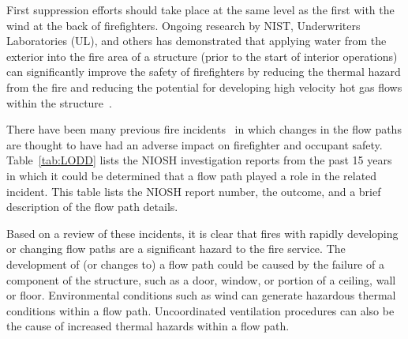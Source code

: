\documentclass[12pt,oneside]{book}
\begin{document}
First suppression efforts should take place at the same level as the first with the wind at the back of firefighters. Ongoing research by NIST, Underwriters Laboratories (UL), and others has demonstrated that applying water from the exterior into the fire area of a structure (prior to the start of interior operations) can significantly improve the safety of firefighters by reducing the thermal hazard from the fire and reducing the potential for developing high velocity hot gas flows within the structure~\cite{madrzykowski2009fire, kerber2009fire}.

There have been many previous fire incidents~\cite{NIOSH:Pettit,NIOSH:Washenitz,NIOSH:Mezzanotte,NIOSH:McFall,NIOSH:McFall2,NIOSH:McFall3,NIOSH:Berardinelli,NIOSH:Koedam,NIOSH:McFall4,NIOSH:Tarley,NIOSH:Braddee,NIOSH:Merinar,NIOSH:Bowyer2,NIOSH:Loflin,NIOSH:Bowyer} in which changes in the flow paths are thought to have had an adverse impact on firefighter and occupant safety. Table~\ref{tab:LODD} lists the NIOSH investigation reports from the past 15 years in which it could be determined that a flow path played a role in the related incident. This table lists the NIOSH report number, the outcome, and a brief description of the flow path details.

Based on a review of these incidents, it is clear that fires with rapidly developing or changing flow paths are a significant hazard to the fire service. The development of (or changes to) a flow path could be caused by the failure of a component of the structure, such as a door, window, or portion of a ceiling, wall or floor. Environmental conditions such as wind can generate hazardous thermal conditions within a flow path. Uncoordinated ventilation procedures can also be the cause of increased thermal hazards within a flow path.
\end{document}
